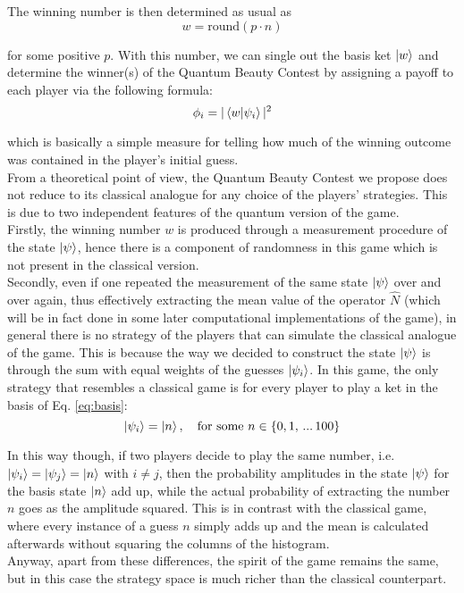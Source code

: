 The winning number is then determined as usual as
\begin{equation}
  w=\text{round}(p\cdot n)
\end{equation}

for some positive $p$. With this number, we can single out the basis ket $\ket{w}$ and determine the winner(s) of the Quantum Beauty Contest by assigning a payoff to each player via the following formula:
\begin{equation}
  \phi_i=|\braket{w|\psi_i}|^2
\end{equation}

which is basically a simple measure for telling how much of the winning outcome was contained in the player's initial guess.\\

From a theoretical point of view, the Quantum Beauty Contest we propose does not reduce to its classical analogue for any choice of the players' strategies. This is due to two independent features of the quantum version of the game.\\

Firstly, the winning number $w$ is produced through a measurement procedure of the state $\ket{\psi}$, hence there is a component of randomness in this game which is not present in the classical version.\\

Secondly, even if one repeated the measurement of the same state $\ket{\psi}$ over and over again, thus effectively
extracting the mean value of the operator $\hat{N}$ (which will be in fact done in some later computational implementations of the game), in general there is no strategy of the players that can simulate the classical analogue of the game. This is because the way we decided to construct the state $\ket{\psi}$ is through the sum with equal weights of the guesses $\ket{\psi_i}$. In this game, the only strategy that resembles a classical game is for every player to play a ket in the basis of Eq. \ref{eq:basis}:
\begin{equation}
  \ket{\psi_i}=\ket{n},\quad \text{for some }n\in\{0,1,\,...\,100\}
\end{equation}

In this way though, if two players decide to play the same number, i.e. $\ket{\psi_i}=\ket{\psi_j}=\ket{n}$ with $i\neq j$, then the probability amplitudes in the state $\ket{\psi}$ for the basis state $\ket{n}$ add up, while the actual probability of extracting the number $n$ goes as the amplitude squared. This is in contrast with the classical game, where every instance of a guess $n$ simply adds up and the mean is calculated afterwards without squaring the columns of the histogram.\\

Anyway, apart from these differences, the spirit of the game remains the same, but in this case the strategy space is much richer than the classical counterpart.\\








